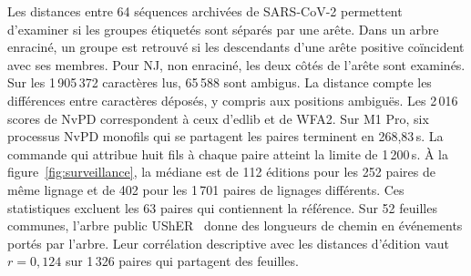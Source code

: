 Les distances entre 64 séquences archivées de SARS-CoV-2 permettent d'examiner si les groupes étiquetés sont séparés par une arête. Dans un arbre enraciné, un groupe est retrouvé si les descendants d'une arête positive coïncident avec ses membres. Pour NJ, non enraciné, les deux côtés de l'arête sont examinés. Sur les 1\,905\,372 caractères lus, 65\,588 sont ambigus. La distance compte les différences entre caractères déposés, y compris aux positions ambiguës.
Les 2\,016 scores de NvPD correspondent à ceux d'edlib et de WFA2. Sur M1 Pro, six processus NvPD monofils qui se partagent les paires terminent en 268,83\,s. La commande qui attribue huit fils à chaque paire atteint la limite de 1\,200\,s. À la figure~\ref{fig:surveillance}, la médiane est de 112 éditions pour les 252 paires de même lignage et de 402 pour les 1\,701 paires de lignages différents. Ces statistiques excluent les 63 paires qui contiennent la référence. Sur 52 feuilles communes, l'arbre public UShER~\cite{usher} donne des longueurs de chemin en événements portés par l'arbre. Leur corrélation descriptive avec les distances d'édition vaut \(r=0,124\) sur 1\,326 paires qui partagent des feuilles.
